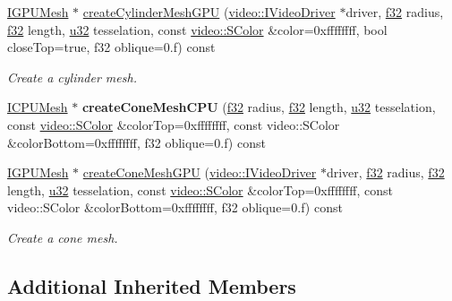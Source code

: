 \begin{DoxyCompactItemize}
\item 
\hyperlink{classirr_1_1scene_1_1IMesh}{I\+G\+P\+U\+Mesh} $\ast$ \hyperlink{classirr_1_1scene_1_1CGeometryCreator_ac35744e4622432d0df0d550c588d5082}{create\+Cylinder\+Mesh\+G\+PU} (\hyperlink{classirr_1_1video_1_1IVideoDriver}{video\+::\+I\+Video\+Driver} $\ast$driver, \hyperlink{namespaceirr_a0277be98d67dc26ff93b1a6a1d086b07}{f32} radius, \hyperlink{namespaceirr_a0277be98d67dc26ff93b1a6a1d086b07}{f32} length, \hyperlink{namespaceirr_a0416a53257075833e7002efd0a18e804}{u32} tesselation, const \hyperlink{classirr_1_1video_1_1SColor}{video\+::\+S\+Color} \&color=0xffffffff, bool close\+Top=true, f32 oblique=0.\+f) const 
\begin{DoxyCompactList}\small\item\em Create a cylinder mesh. \end{DoxyCompactList}\item 
\hyperlink{classirr_1_1scene_1_1IMesh}{I\+C\+P\+U\+Mesh} $\ast$ {\bfseries create\+Cone\+Mesh\+C\+PU} (\hyperlink{namespaceirr_a0277be98d67dc26ff93b1a6a1d086b07}{f32} radius, \hyperlink{namespaceirr_a0277be98d67dc26ff93b1a6a1d086b07}{f32} length, \hyperlink{namespaceirr_a0416a53257075833e7002efd0a18e804}{u32} tesselation, const \hyperlink{classirr_1_1video_1_1SColor}{video\+::\+S\+Color} \&color\+Top=0xffffffff, const video\+::\+S\+Color \&color\+Bottom=0xffffffff, f32 oblique=0.\+f) const \hypertarget{classirr_1_1scene_1_1CGeometryCreator_a229519d3118ba2d02ee9eb4c85143d5b}{}\label{classirr_1_1scene_1_1CGeometryCreator_a229519d3118ba2d02ee9eb4c85143d5b}

\item 
\hyperlink{classirr_1_1scene_1_1IMesh}{I\+G\+P\+U\+Mesh} $\ast$ \hyperlink{classirr_1_1scene_1_1CGeometryCreator_a6587c178f43773c42d4566c93147eebb}{create\+Cone\+Mesh\+G\+PU} (\hyperlink{classirr_1_1video_1_1IVideoDriver}{video\+::\+I\+Video\+Driver} $\ast$driver, \hyperlink{namespaceirr_a0277be98d67dc26ff93b1a6a1d086b07}{f32} radius, \hyperlink{namespaceirr_a0277be98d67dc26ff93b1a6a1d086b07}{f32} length, \hyperlink{namespaceirr_a0416a53257075833e7002efd0a18e804}{u32} tesselation, const \hyperlink{classirr_1_1video_1_1SColor}{video\+::\+S\+Color} \&color\+Top=0xffffffff, const video\+::\+S\+Color \&color\+Bottom=0xffffffff, f32 oblique=0.\+f) const 
\begin{DoxyCompactList}\small\item\em Create a cone mesh. \end{DoxyCompactList}\end{DoxyCompactItemize}
\subsection*{Additional Inherited Members}


